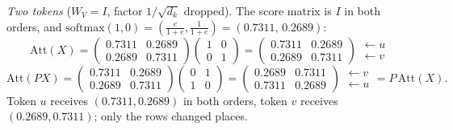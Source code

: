 \emph{Two tokens} ($W_V=I$, factor $1/\sqrt{d_k}$ dropped). The score matrix is $I$ in both orders, and
$\mathrm{softmax}(1,0)=(\tfrac{e}{1+e},\tfrac{1}{1+e})=(0.7311,\,0.2689)$:
\[
\mathrm{Att}(X)=\begin{pmatrix}0.7311&0.2689\\0.2689&0.7311\end{pmatrix}\!\begin{pmatrix}1&0\\0&1\end{pmatrix}
=\begin{pmatrix}0.7311&0.2689\\0.2689&0.7311\end{pmatrix}\begin{matrix}\leftarrow u\\ \leftarrow v\end{matrix}
\]
\[
\mathrm{Att}(PX)=\begin{pmatrix}0.7311&0.2689\\0.2689&0.7311\end{pmatrix}\!\begin{pmatrix}0&1\\1&0\end{pmatrix}
=\begin{pmatrix}0.2689&0.7311\\0.7311&0.2689\end{pmatrix}\begin{matrix}\leftarrow v\\ \leftarrow u\end{matrix}
=P\,\mathrm{Att}(X).
\]
Token $u$ receives $(0.7311,0.2689)$ in both orders, token $v$ receives $(0.2689,0.7311)$; only the rows changed places.

